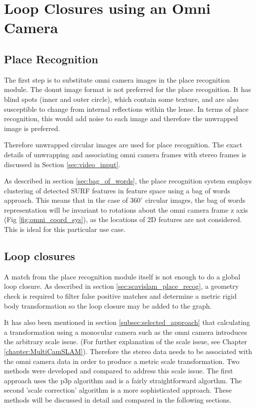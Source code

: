 \chapter{Loop Closures using an Omni Camera}
\label{chapter:omni_loop_close}

\section{Place Recognition}

The first step is to substitute omni camera images in the place recognition module. The donut image format is not preferred for the place recognition.  It has blind spots (inner and outer circle), which contain some texture, and are also susceptible to change from internal reflections within the lense.  In terms of place recognition, this would add noise to each image and therefore the unwrapped image is preferred.

Therefore unwrapped circular images are used for place recognition.  The exact details of unwrapping and associating omni camera frames with stereo frames is discussed in Section \ref{sec:video_input}.

As described in section \ref{sec:bag_of_words}, the place recognition system employs clustering of detected SURF features in feature space using a bag of words approach.  This means that in the case of $360^\circ$ circular images, the bag of words representation will be invariant to rotations about the omni camera frame z axis (Fig \ref{fig:omni_coord_sys}), as the locations of 2D features are not considered.  This is ideal for this particular use case.

\section{Loop closures}
\label{sec:calc_loop_edge}

A match from the place recognition module itself is not enough to do a global loop closure.  As described in section \ref{sec:scavislam_place_recog}, a geometry check is required to filter false positive matches and determine a metric rigid body transformation so the loop closure may be added to the graph.

It has also been mentioned in section \ref{subsec:selected_approach} that calculating a transformation using a monocular camera such as the omni camera introduces the arbitrary scale issue.  (For further explanation of the scale issue, see Chapter \ref{chapter:MultiCamSLAM}). Therefore the stereo data needs to be associated with the omni camera data in order to produce a metric scale transformation.  Two methods were developed and compared to address this scale issue.  The first approach uses the p3p algorithm and is a fairly straightforward algorthm.  The second 'scale correction' algorithm is a more sophisticated approach.  These methods will be discussed in detail and compared in the following sections. 

